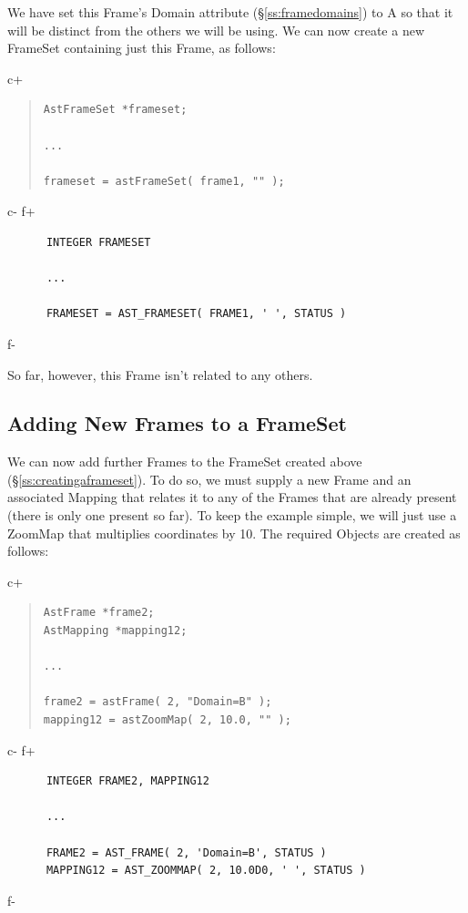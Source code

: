 \documentclass[twoside,11pt]{article}
\newcommand{\secref}[1]{\S\ref{#1}}
\newcommand{\secref}[1]{\ref{#1}}
\begin{document}
We have set this Frame's Domain attribute (\secref{ss:framedomains}) to
A so that it will be distinct from the others we will be using. We can
now create a new FrameSet containing just this Frame, as follows:

c+
\begin{quote}
\small
\begin{verbatim}
AstFrameSet *frameset;

...

frameset = astFrameSet( frame1, "" );
\end{verbatim}
\normalsize
\end{quote}
c-
f+
\small
\begin{verbatim}
      INTEGER FRAMESET

      ...

      FRAMESET = AST_FRAMESET( FRAME1, ' ', STATUS )
\end{verbatim}
\normalsize
f-

So far, however, this Frame isn't related to any others.

\subsection{\label{ss:addingframes}Adding New Frames to a FrameSet}

We can now add further Frames to the FrameSet created above
(\secref{ss:creatingaframeset}). To do so, we must supply a new Frame
and an associated Mapping that relates it to any of the Frames that
are already present (there is only one present so far).  To keep the
example simple, we will just use a ZoomMap that multiplies coordinates
by 10. The required Objects are created as follows:

c+
\begin{quote}
\small
\begin{verbatim}
AstFrame *frame2;
AstMapping *mapping12;

...

frame2 = astFrame( 2, "Domain=B" );
mapping12 = astZoomMap( 2, 10.0, "" );
\end{verbatim}
\normalsize
\end{quote}
c-
f+
\small
\begin{verbatim}
      INTEGER FRAME2, MAPPING12

      ...

      FRAME2 = AST_FRAME( 2, 'Domain=B', STATUS )
      MAPPING12 = AST_ZOOMMAP( 2, 10.0D0, ' ', STATUS )
\end{verbatim}
\normalsize
f-
\end{document}

